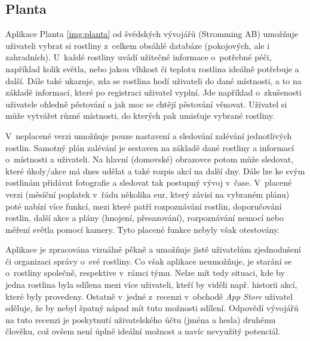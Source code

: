 \documentclass[thesis=M,czech]{FITthesis}[2019/12/23]
\begin{document}
\subsection{Planta}
    Aplikace Planta \ref{img:planta} od švédských vývojářů (Stromming AB) umožňuje uživateli vybrat si rostliny z~celkem obsáhlé databáze (pokojových, ale i zahradních). U~každé rostliny uvádí užitečné informace o~potřebné péči, například kolik světla, nebo jakou vlhkost či teplotu rostlina ideálně potřebuje a další. Dále také ukazuje, zda se rostlina hodí uživateli do dané místnosti, a to na základě informací, které po registraci uživatel vyplní. Jde například o~zkušenosti uživatele ohledně pěstování a jak moc se chtějí pěstování věnovat. Uživatel si může vytvářet různé místnosti, do kterých pak umisťuje vybrané rostliny.
    
    V~neplacené verzi umožňuje pouze nastavení a sledování zalévání jednotlivých rostlin. Samotný plán zalévání je sestaven na základě dané rostliny a informací o~místnosti a uživateli. Na hlavní (domovské) obrazovce potom může sledovat, které úkoly/akce má dnes udělat a také rozpis akcí na další dny. Dále lze ke svým rostlinám přidávat fotografie a sledovat tak postupný vývoj v~čase. V~placené verzi (měsíční poplatek v~řádu několika eur, který závisí na vybraném plánu) poté nabízí více funkcí, mezi které patří rozpoznávání rostlin, doporučování rostlin, další akce a plány (hnojení, přesazování), rozpoznávání nemocí nebo měření světla pomocí kamery. Tyto placené funkce nebyly však otestovány.
    
    Aplikace je zpracována vizuálně pěkně a umožňuje jistě uživatelům zjednodušení či organizaci správy o~své rostliny. Co však aplikace neumožňuje, je starání se o~rostliny společně, respektive v~rámci týmu. Nelze mít tedy situaci, kde by jedna rostlina byla sdílena mezi více uživateli, kteří by viděli např. historii akcí, které byly provedeny. Ostatně v~jedné z~recenzi v~obchodě \textit{App Store} uživatel sděluje, že by nebyl špatný nápad mít tuto možnosti sdílení. Odpovědí vývojářů na tuto recenzi je poskytnutí uživatelského účtu (jména a hesla) druhému člověku, což ovšem není úplně ideální možnost a navíc nevyužitý potenciál.
    
\end{document}
